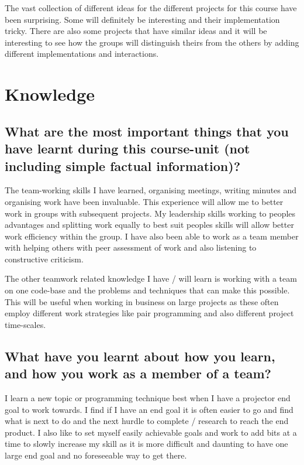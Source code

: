 \documentclass[12pt]{article}
\begin{document}
      The vast collection of different ideas for the different projects for this
      course have been surprising. Some will definitely be interesting and their
      implementation tricky. There are also some projects that have similar 
      ideas and it will be interesting to see how the groups will distinguish
      theirs from the others by adding different implementations and 
      interactions.
  \section{Knowledge}
    \subsection{What are the most important things that you have learnt during
      this course-unit (not including simple factual information)?}
      The team-working skills I have learned, organising meetings, writing
      minutes and organising work have been invaluable. This experience will
      allow me to better work in groups with subsequent projects. My leadership
      skills working to peoples advantages and splitting work equally to best
      suit peoples skills will allow better work efficiency within the group. I
      have also been able to work as a team member with helping others with peer
      assessment of work and also listening to constructive criticism.

      The other teamwork related knowledge I have / will learn is working with
      a team on one code-base and the problems and techniques that can make this
      possible. This will be useful when working in business on large projects
      as these often employ different work strategies like pair programming and
      also different project time-scales.
    \subsection{What have you learnt about how you learn, and how you work as
      a member of a team?}
      I learn a new topic or programming technique best when I have a projector 
      end goal to work towards. I find if I have an end goal it is often easier 
      to go and find what is next to do and the next hurdle to complete / 
      research to reach the end product. I also like to set myself easily 
      achievable goals and work to add bits at a time to slowly increase my 
      skill as it is more difficult and daunting to have one large end goal and
      no foreseeable way to get there.
\end{document}
